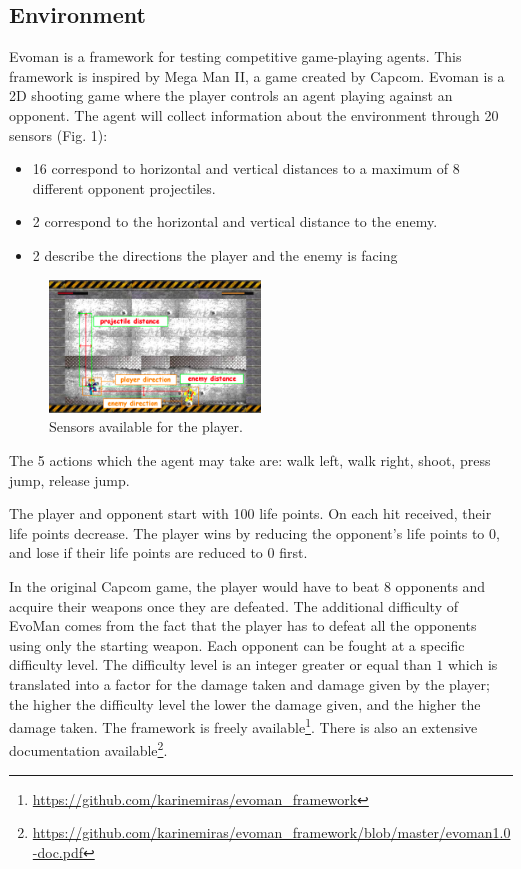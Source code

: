 \documentclass[conference]{IEEEtran}
\begin{document}
    \subsection{Environment}\label{subsec:environment}

    Evoman\cite{karinemiras,evoman} is a framework for testing competitive game-playing agents.
    This framework is inspired by Mega Man II\cite{capcom}, a game created by Capcom.
    Evoman is a 2D shooting game where the player controls an agent playing against an opponent.
    The agent will collect information about the environment through 20 sensors (Fig. 1):
    \begin{itemize}
        \item 16 correspond to horizontal and vertical distances to a maximum of 8 different opponent projectiles.
        \item 2 correspond to the horizontal and vertical distance to the enemy.
        \item 2 describe the directions the player and the enemy is facing
    \end{itemize}
    \begin{figure}
        \centering
        \includegraphics[width=0.5\textwidth]{images/Evoman3.png}
        \caption{Sensors available for the player\cite{evoman}.}
        \label{fig:sensors}
    \end{figure}
    The 5 actions which the agent may take are: walk left, walk right, shoot, press jump, release jump.

    The player and opponent start with 100 life points. On each hit received, their life points decrease.
    The player wins by reducing the opponent's life points to $0$, and lose if their life points are reduced to $0$ first.

    In the original Capcom game, the player would have to beat $8$ opponents and acquire their weapons
    once they are defeated.
    The additional difficulty of EvoMan comes from the fact that the player has to defeat all
    the opponents using only the starting weapon.
    Each opponent can be fought at a specific difficulty level.
    The difficulty level is an integer greater or equal than $1$ which is translated into a factor for the damage
    taken and damage given by the player; the higher the difficulty level the lower the damage given, and the higher the damage taken.
    The framework is freely available\footnote{\url{https://github.com/karinemiras/evoman_framework}}.
    There is also an extensive documentation
    available\footnote{\url{https://github.com/karinemiras/evoman_framework/blob/master/evoman1.0-doc.pdf}}.
\end{document}
